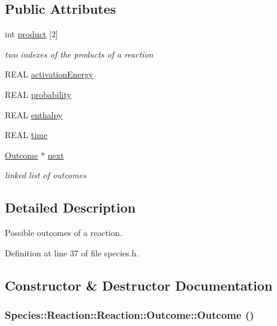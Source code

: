 \subsection*{Public Attributes}
\begin{CompactItemize}
\item 
int \hyperlink{structSpecies_1_1Reaction_1_1Outcome_a9db2fbca0e21ce3059f4bfc3867d637}{product} \mbox{[}2\mbox{]}
\begin{CompactList}\small\item\em two indexes of the products of a reaction \item\end{CompactList}\item 
REAL \hyperlink{structSpecies_1_1Reaction_1_1Outcome_0508262e12d36ea36e1cd3c3c8f02a0b}{activationEnergy}
\item 
REAL \hyperlink{structSpecies_1_1Reaction_1_1Outcome_7db6b3e12d84984760d20418877463e4}{probability}
\item 
REAL \hyperlink{structSpecies_1_1Reaction_1_1Outcome_1b5db8fd0f9fa996a6c7624c83201141}{enthalpy}
\item 
REAL \hyperlink{structSpecies_1_1Reaction_1_1Outcome_654cf802ce7437099ab5fcb4cb1a670d}{time}
\item 
\hyperlink{structSpecies_1_1Reaction_1_1Outcome}{Outcome} $\ast$ \hyperlink{structSpecies_1_1Reaction_1_1Outcome_fc6cab6ededafb32e7fabd312a18bb0b}{next}
\begin{CompactList}\small\item\em linked list of outcomes \item\end{CompactList}\end{CompactItemize}


\subsection{Detailed Description}
Possible outcomes of a reaction. 

Definition at line 37 of file species.h.

\subsection{Constructor \& Destructor Documentation}
\hypertarget{structSpecies_1_1Reaction_1_1Outcome_f0372a4ff441442b95fb549c2822e443}{
\subsubsection[{Outcome}]{\setlength{\rightskip}{0pt plus 5cm}Species::Reaction::Reaction::Outcome::Outcome ()}}
\label{structSpecies_1_1Reaction_1_1Outcome_f0372a4ff441442b95fb549c2822e443}





